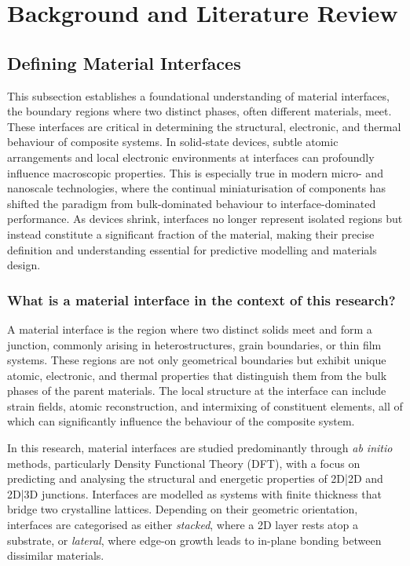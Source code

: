 \chapter{Background and Literature Review} \label{chapter:background} 
 
\section{Defining Material Interfaces} \label{section:material_interfaces} 
 
This subsection establishes a foundational understanding of material interfaces, the boundary regions where two distinct phases, often different materials, meet. These interfaces are critical in determining the structural, electronic, and thermal behaviour of composite systems. In solid-state devices, subtle atomic arrangements and local electronic environments at interfaces can profoundly influence macroscopic properties. This is especially true in modern micro- and nanoscale technologies, where the continual miniaturisation of components has shifted the paradigm from bulk-dominated behaviour to interface-dominated performance. As devices shrink, interfaces no longer represent isolated regions but instead constitute a significant fraction of the material, making their precise definition and understanding essential for predictive modelling and materials design. 
 
\subsection{What is a material interface in the context of this research?} 
 
A material interface is the region where two distinct solids meet and form a junction, commonly arising in heterostructures, grain boundaries, or thin film systems. These regions are not only geometrical boundaries but exhibit unique atomic, electronic, and thermal properties that distinguish them from the bulk phases of the parent materials. The local structure at the interface can include strain fields, atomic reconstruction, and intermixing of constituent elements, all of which can significantly influence the behaviour of the composite system. 
 
In this research, material interfaces are studied predominantly through \textit{ab initio} methods, particularly Density Functional Theory (DFT), with a focus on predicting and analysing the structural and energetic properties of 2D|2D and 2D|3D junctions. Interfaces are modelled as systems with finite thickness that bridge two crystalline lattices. Depending on their geometric orientation, interfaces are categorised as either \emph{stacked}, where a 2D layer rests atop a substrate, or \emph{lateral}, where edge-on growth leads to in-plane bonding between dissimilar materials. 
 
